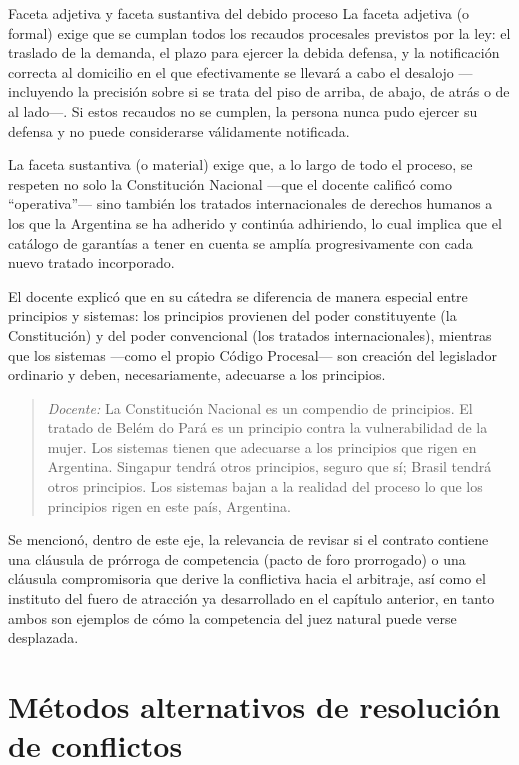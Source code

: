 \documentclass[12pt,oneside]{book}
\begin{document}
\begin{definition}{Faceta adjetiva y faceta sustantiva del debido proceso}
La faceta adjetiva (o formal) exige que se cumplan todos los recaudos procesales previstos por la ley: el traslado de la demanda, el plazo para ejercer la debida defensa, y la notificación correcta al domicilio en el que efectivamente se llevará a cabo el desalojo —incluyendo la precisión sobre si se trata del piso de arriba, de abajo, de atrás o de al lado—. Si estos recaudos no se cumplen, la persona nunca pudo ejercer su defensa y no puede considerarse válidamente notificada.

La faceta sustantiva (o material) exige que, a lo largo de todo el proceso, se respeten no solo la Constitución Nacional —que el docente calificó como ``operativa''— sino también los tratados internacionales de derechos humanos a los que la Argentina se ha adherido y continúa adhiriendo, lo cual implica que el catálogo de garantías a tener en cuenta se amplía progresivamente con cada nuevo tratado incorporado.
\end{definition}

El docente explicó que en su cátedra se diferencia de manera especial entre principios y sistemas: los principios provienen del poder constituyente (la Constitución) y del poder convencional (los tratados internacionales), mientras que los sistemas —como el propio Código Procesal— son creación del legislador ordinario y deben, necesariamente, adecuarse a los principios.

\begin{quote}
\textit{Docente:} La Constitución Nacional es un compendio de principios. El tratado de Belém do Pará es un principio contra la vulnerabilidad de la mujer. Los sistemas tienen que adecuarse a los principios que rigen en Argentina. Singapur tendrá otros principios, seguro que sí; Brasil tendrá otros principios. Los sistemas bajan a la realidad del proceso lo que los principios rigen en este país, Argentina.
\end{quote}

Se mencionó, dentro de este eje, la relevancia de revisar si el contrato contiene una cláusula de prórroga de competencia (pacto de foro prorrogado) o una cláusula compromisoria que derive la conflictiva hacia el arbitraje, así como el instituto del fuero de atracción ya desarrollado en el capítulo anterior, en tanto ambos son ejemplos de cómo la competencia del juez natural puede verse desplazada.

\section{Métodos alternativos de resolución de conflictos}
\end{document}
